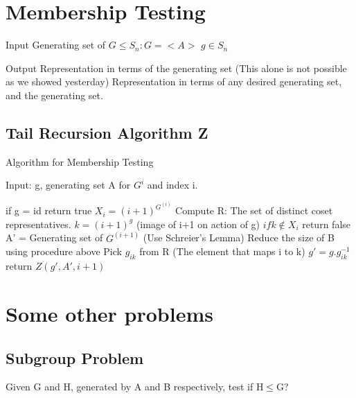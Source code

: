 \section{Membership Testing}
Input\newline
	Generating set of $G \leq S_n: G= <A>$
	$g\in S_n$

Output
	Representation in terms of the generating set (This alone is not possible as we showed yesterday)
	Representation in terms of any desired generating set, and the generating set.

\subsection{Tail Recursion Algorithm Z}
\begin{algorithm}
\caption{Algorithm for Membership Testing}\label{orbit}
\label{alg:tail_rec_membership}
\begin{algorithmic}[1]
\item 
Input: g, generating set A for $G^i$ and index i.\newline

if g = id return true\newline
$X_i = (i+1)^{G^{(i)}}$\newline
Compute R: The set of distinct coset representatives.\newline
$k = (i+1)^g$ (image of i+1 on action of g)\newline
$if k \notin X_i$ return false\newline
A' = Generating set of $G^{(i+1)}$ (Use Schreier's Lemma)\newline
Reduce the size of B using procedure above\newline
Pick $g_{ik}$ from R (The element that maps i to k)\newline
$g' = g.g_{ik}^{-1}$\newline
return $Z(g', A', i+1)$\newline
\end{algorithmic}
\end{algorithm}

\section{Some other problems}
\subsection{Subgroup Problem}
Given G and H, generated by A and B respectively, test if H$\leq$G?

